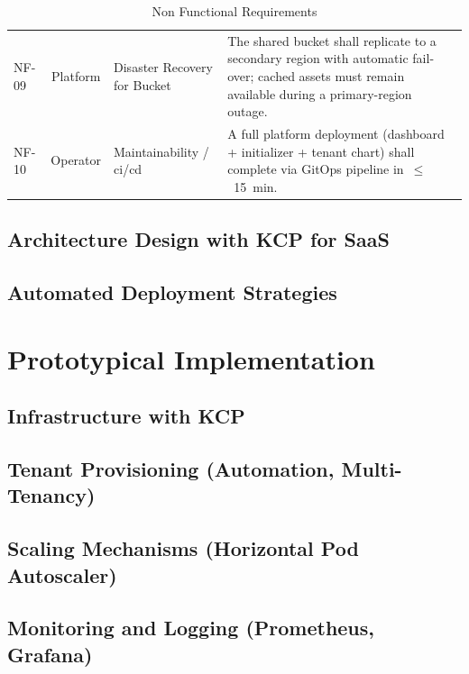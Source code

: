 \documentclass[11pt, a4paper, oneside, listof=totoc]{scrartcl}
\begin{document}
\begin{table}[H]
\begin{tabular}{lcp{4cm}P{8cm}}
                        \hypertarget{nf9}{NF-09} & Platform & Disaster Recovery for Bucket & The shared bucket shall replicate to a secondary region with automatic fail-over; cached assets must remain available during a primary-region outage. \\
                        \hypertarget{nf10}{NF-10} & Operator & Maintainability / \gls{ci}/\gls{cd} & A full platform deployment (dashboard + initializer + tenant chart) shall complete via GitOps pipeline in~$\leq$~15~min. \\
                        \bottomrule
                    \end{tabular}
                    \caption{Non Functional Requirements}
                \end{table}

        \subsection{Architecture Design with KCP for SaaS}\label{subsec:architectureDesign}

        \subsection{Automated Deployment Strategies}\label{subsec:deploymentStrategies}

    \section{Prototypical Implementation}\label{sec:prototype}

        \subsection{Infrastructure with KCP}\label{subsec:infrastructure}

        \subsection[Tenant Provisioning]{Tenant Provisioning (Automation, Multi-Tenancy)}\label{subsec:tenantProvisioning}

        \subsection[Scaling Mechanisms]{Scaling Mechanisms (Horizontal Pod Autoscaler)}\label{subsec:scaling}

        \subsection[Monitoring and Logging]{Monitoring and Logging (Prometheus, Grafana)}\label{subsec:monitoring}
\end{document}
